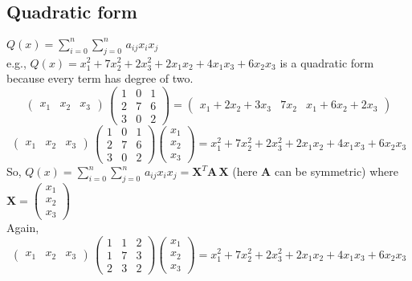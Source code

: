 \documentclass[../main-sheet.tex]{subfiles}
\begin{document}
\subsection{Quadratic form} \(Q(x)=\sum_{i=0}^n \sum_{j=0}^n\,a_{ij}x_ix_j\)\\
e.g., \(Q(x)=x_1^2+7x_2^2+2x_3^2+2x_1x_2+4x_1x_3+6x_2x_3\) is a quadratic form because every term has degree of two.\\
\[\begin{pmatrix}
    x_1 & x_2 & x_3
\end{pmatrix}\,\begin{pmatrix}
    1& 0&1\\
    2& 7&6\\
    3& 0&2
\end{pmatrix}=\begin{pmatrix}
    x_1+2x_2+3x_3 & 7x_2 & x_1+6x_2+2x_3
\end{pmatrix}\]
\[\begin{pmatrix}
    x_1 & x_2 & x_3
\end{pmatrix}\,\begin{pmatrix}
    1& 0&1\\
    2& 7&6\\
    3& 0&2
\end{pmatrix}\begin{pmatrix}
    x_1\\
    x_2\\
    x_3
\end{pmatrix}=x_1^2+7x_2^2+2x_3^2+2x_1x_2+4x_1x_3+6x_2x_3
\]
So, \(Q(x)=\sum_{i=0}^n \sum_{j=0}^n\,a_{ij}x_ix_j=\mathbf{X}^T\mathbf{A\,X}\) (here \(\mathbf{A}\) can be symmetric) where \(\mathbf{X}=\begin{pmatrix}
    x_1\\
    x_2\\
    x_3
\end{pmatrix}\)\\
Again,
\[\begin{pmatrix}
    x_1 & x_2 & x_3
\end{pmatrix}\,\begin{pmatrix}
    1& 1&2\\
    1& 7&3\\
    2& 3&2
\end{pmatrix}\begin{pmatrix}
    x_1\\
    x_2\\
    x_3
\end{pmatrix}=x_1^2+7x_2^2+2x_3^2+2x_1x_2+4x_1x_3+6x_2x_3
\]
\end{document}
